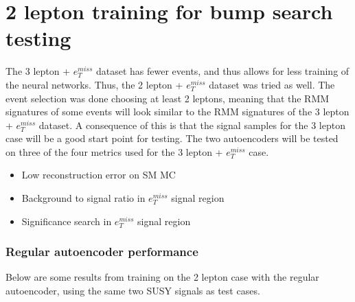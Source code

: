 
\section{2 lepton training for bump search testing}\label{sec:2lep}

The 3 lepton + $e_T^{miss}$ dataset has fewer events, and thus allows for less training of the neural networks. 
Thus, the 2 lepton + $e_T^{miss}$ dataset was tried as well. The event selection was done choosing at least 
2 leptons, meaning that the RMM signatures of some events will look similar to the RMM signatures of 
the 3 lepton + $e_T^{miss}$ dataset. A consequence of this is that the signal samples for the 3 lepton case 
will be a good start point for testing. The two autoencoders will be tested on three of the 
four metrics used for the 3 lepton + $e_T^{miss}$ case. 
\begin{itemize}
    \item Low reconstruction error on SM MC
    \item Background to signal ratio in $e_T^{miss}$ signal region
    \item Significance search in $e_T^{miss}$ signal region
\end{itemize}

\subsubsection*{Regular autoencoder performance}
Below are some results from training on the 2 lepton case with the regular autoencoder, using the same two SUSY signals as test cases. 


